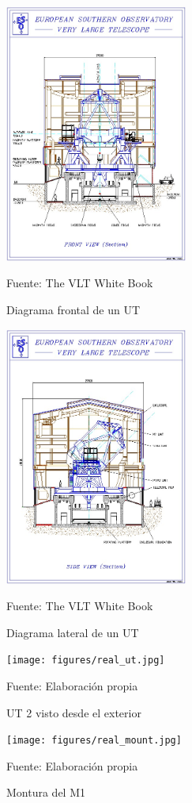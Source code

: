 \begin{figure}[h]
\centering
\includegraphics[width=6cm]{figures/front_ut.jpg}
\caption{\label{fig:front_ut} Diagrama frontal de un UT} Fuente: The VLT White Book \cite{eso1998vlt}
\end{figure}

\begin{figure}[h]
\centering
\includegraphics[width=6cm]{figures/side_ut.jpg}
\caption{\label{fig:side_ut} Diagrama lateral de un UT} Fuente: The VLT White Book \cite{eso1998vlt}
\end{figure}

\begin{figure}[h]
\centering
\texttt{[image: figures/real\_ut.jpg]}
\caption{\label{fig:real_ut} UT 2 visto desde el exterior} Fuente: Elaboración propia
\end{figure}

\begin{figure}[h]
\centering
\texttt{[image: figures/real\_mount.jpg]}
\caption{\label{fig:real_mount} Montura del M1} Fuente: Elaboración propia
\end{figure}

